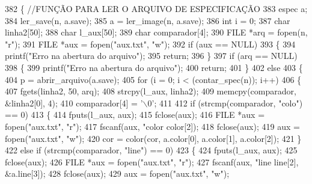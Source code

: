\begin{DoxyCode}
382 \{ \textcolor{comment}{//FUNÇÃO PARA LER O ARQUIVO DE ESPECIFICAÇÃO}
383     espec a;
384     ler_save(n, a.save);
385     a = ler_image(n, a.save);
386     \textcolor{keywordtype}{int} i = 0;
387     \textcolor{keywordtype}{char} linha2[50];
388     \textcolor{keywordtype}{char} l\_aux[50];
389     \textcolor{keywordtype}{char} comparador[4];
390     FILE *arq = fopen(n, \textcolor{stringliteral}{"r"});
391     FILE *aux = fopen(\textcolor{stringliteral}{"aux.txt"}, \textcolor{stringliteral}{"w"});
392     \textcolor{keywordflow}{if} (aux == NULL)
393     \{
394         printf(\textcolor{stringliteral}{"Erro na abertura do arquivo"});
395         \textcolor{keywordflow}{return};
396     \}
397     \textcolor{keywordflow}{if} (arq == NULL)
398     \{
399         printf(\textcolor{stringliteral}{"Erro na abertura do arquivo"});
400         \textcolor{keywordflow}{return};
401     \}
402     \textcolor{keywordflow}{else}
403     \{
404         p = abrir_arquivo(a.save);
405         \textcolor{keywordflow}{for} (i = 0; i < (contar_spec(n)); i++)
406         \{
407             fgets(linha2, 50, arq);
408             strcpy(l\_aux, linha2);
409             memcpy(comparador, &linha2[0], 4);
410             comparador[4] = \textcolor{charliteral}{'\(\backslash\)0'};
411 
412             \textcolor{keywordflow}{if} (strcmp(comparador, \textcolor{stringliteral}{"colo"}) == 0)
413             \{
414                 fputs(l\_aux, aux);
415                 fclose(aux);
416                 FILE *aux = fopen(\textcolor{stringliteral}{"aux.txt"}, \textcolor{stringliteral}{"r"});
417                 fscanf(aux, \textcolor{stringliteral}{"color %
      color[2]);
418                 fclose(aux);
419                 aux = fopen(\textcolor{stringliteral}{"aux.txt"}, \textcolor{stringliteral}{"w"});
420                 cor = color(cor, a.color[0], a.color[1], a.color[2]);
421             \}
422             \textcolor{keywordflow}{else} \textcolor{keywordflow}{if} (strcmp(comparador, \textcolor{stringliteral}{"line"}) == 0)
423             \{
424                 fputs(l\_aux, aux);
425                 fclose(aux);
426                 FILE *aux = fopen(\textcolor{stringliteral}{"aux.txt"}, \textcolor{stringliteral}{"r"});
427                 fscanf(aux, \textcolor{stringliteral}{"line %
      line[2], &a.line[3]);
428                 fclose(aux);
429                 aux = fopen(\textcolor{stringliteral}{"aux.txt"}, \textcolor{stringliteral}{"w"});
}}
\end{DoxyCode}
